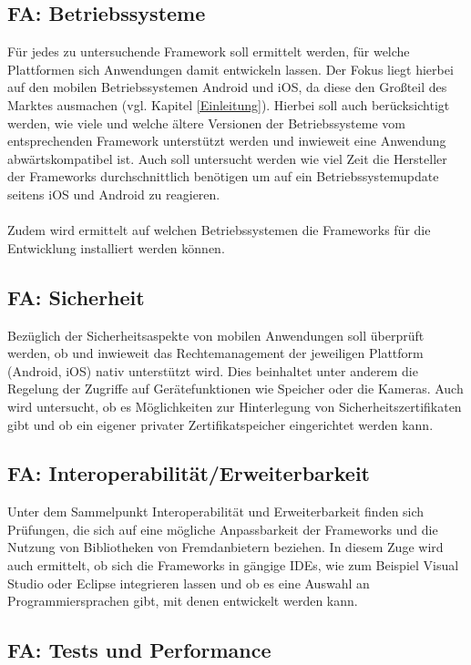 \subsection*{FA: Betriebssysteme}

Für jedes zu untersuchende Framework soll ermittelt werden, für welche Plattformen sich Anwendungen damit entwickeln lassen. Der Fokus liegt hierbei auf den mobilen Betriebssystemen Android und iOS, da diese den Großteil des Marktes ausmachen (vgl. Kapitel \ref{Einleitung}). Hierbei soll auch berücksichtigt werden, wie viele und welche ältere Versionen der Betriebssysteme vom entsprechenden Framework unterstützt werden und inwieweit eine Anwendung abwärtskompatibel ist. Auch soll untersucht werden wie viel Zeit die Hersteller der Frameworks durchschnittlich benötigen um auf ein Betriebssystemupdate seitens iOS und Android zu reagieren.
\\\\
Zudem wird ermittelt auf welchen Betriebssystemen die Frameworks für die Entwicklung installiert werden können.  

\subsection*{FA: Sicherheit}

Bezüglich der Sicherheitsaspekte von mobilen Anwendungen soll überprüft werden, ob und inwieweit das Rechtemanagement der jeweiligen Plattform (Android, iOS) nativ unterstützt wird. Dies beinhaltet unter anderem die Regelung der Zugriffe auf Gerätefunktionen wie Speicher oder die Kameras. Auch wird untersucht, ob es Möglichkeiten zur Hinterlegung von Sicherheitszertifikaten gibt und ob ein eigener privater Zertifikatspeicher eingerichtet werden kann. 

\subsection*{FA: Interoperabilität/Erweiterbarkeit}

Unter dem Sammelpunkt Interoperabilität und Erweiterbarkeit finden sich Prüfungen, die sich auf eine mögliche Anpassbarkeit der Frameworks und die Nutzung von Bibliotheken von Fremdanbietern beziehen. In diesem Zuge wird auch ermittelt, ob sich die Frameworks in gängige IDEs, wie zum Beispiel Visual Studio oder Eclipse integrieren lassen und ob es eine Auswahl an Programmiersprachen gibt, mit denen entwickelt werden kann.

\subsection*{FA: Tests und Performance}

